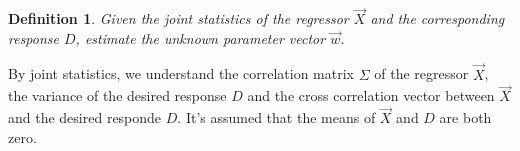 \documentclass[twocolumn]{article}
\newtheorem{definition}{Definition}[section]
\begin{document}
\begin{definition}
	Given the joint statistics of the regressor $ \vec{X} $ and the corresponding response $ D $, estimate the unknown parameter vector $ \vec{w} $.
\end{definition}

By joint statistics, we understand the correlation matrix $ \Sigma $ of the regressor $ \vec{X} $, the variance of the desired response $D$ and the cross correlation vector between $ \vec{X} $ and the desired responde $ D $. It's assumed that the means of $ \vec{X} $ and $ D $ are both zero.
\end{document}

